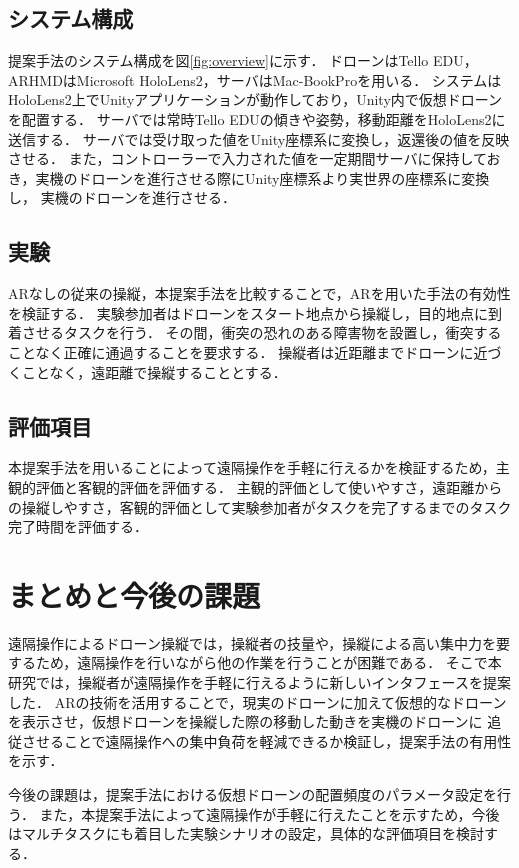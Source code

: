 \documentclass[a4paper,10pt,twocolumn,uplatex]{jsarticle}
\begin{document}
\subsection{システム構成}
提案手法のシステム構成を図\ref{fig:overview}に示す．
ドローンはTello EDU，ARHMDはMicrosoft HoloLens2，サーバはMac-BookProを用いる．
システムはHoloLens2上でUnityアプリケーションが動作しており，Unity内で仮想ドローンを配置する．
サーバでは常時Tello EDUの傾きや姿勢，移動距離をHoloLens2に送信する．
サーバでは受け取った値をUnity座標系に変換し，返還後の値を反映させる．
また，コントローラーで入力された値を一定期間サーバに保持しておき，実機のドローンを進行させる際にUnity座標系より実世界の座標系に変換し，
実機のドローンを進行させる．


\subsection{実験}
ARなしの従来の操縦，本提案手法を比較することで，ARを用いた手法の有効性を検証する．
実験参加者はドローンをスタート地点から操縦し，目的地点に到着させるタスクを行う．
その間，衝突の恐れのある障害物を設置し，衝突することなく正確に通過することを要求する．
操縦者は近距離までドローンに近づくことなく，遠距離で操縦することとする．


\subsection{評価項目}
本提案手法を用いることによって遠隔操作を手軽に行えるかを検証するため，主観的評価と客観的評価を評価する．
主観的評価として使いやすさ，遠距離からの操縦しやすさ，客観的評価として実験参加者がタスクを完了するまでのタスク完了時間を評価する．


\section{まとめと今後の課題}
遠隔操作によるドローン操縦では，操縦者の技量や，操縦による高い集中力を要するため，遠隔操作を行いながら他の作業を行うことが困難である．
そこで本研究では，操縦者が遠隔操作を手軽に行えるように新しいインタフェースを提案した．
ARの技術を活用することで，現実のドローンに加えて仮想的なドローンを表示させ，仮想ドローンを操縦した際の移動した動きを実機のドローンに
追従させることで遠隔操作への集中負荷を軽減できるか検証し，提案手法の有用性を示す．
\par
今後の課題は，提案手法における仮想ドローンの配置頻度のパラメータ設定を行う．
また，本提案手法によって遠隔操作が手軽に行えたことを示すため，今後はマルチタスクにも着目した実験シナリオの設定，具体的な評価項目を検討する．
\end{document}
